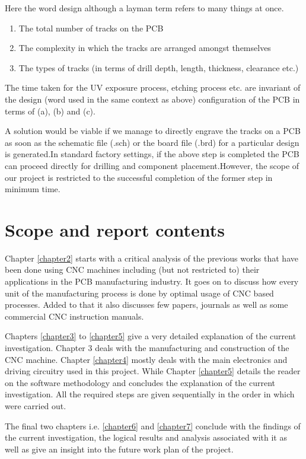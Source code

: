 Here the word design although a layman term refers to many things at once.
\begin{enumerate}
 \item The total number of tracks on the PCB
 \item The complexity in which the tracks are arranged amongst themselves
 \item The types of tracks (in terms of drill depth, length, thickness, clearance etc.)
\end{enumerate}

The time taken for the UV exposure process, etching process etc. are invariant of the design (word used in the same context as above) configuration of the PCB in terms of (a), (b) and (c). \par

A solution would be viable if we manage to directly engrave the tracks on a PCB as soon as the schematic file (.sch) or the board file (.brd) for a particular design is generated.In standard factory settings, if the above step is completed the PCB can proceed directly for drilling and component placement.However, the scope of our project is restricted to the successful completion of the former step in minimum time.



\section{Scope and report contents}
Chapter \ref{chapter2} starts with a critical analysis of the previous works that have been done using CNC machines including (but not restricted to) their applications in the PCB manufacturing industry. It goes on to discuss how every unit of the manufacturing process is done by optimal usage of CNC based processes. Added to that it also discusses few papers, journals as well as some commercial CNC instruction manuals. \par

Chapters \ref{chapter3} to \ref{chapter5} give a very detailed explanation of the current investigation. Chapter 3 deals with the manufacturing and construction of the CNC machine. Chapter \ref{chapter4} mostly deals with the main electronics and driving circuitry used in this project. While Chapter \ref{chapter5} details the reader on the software methodology and concludes the explanation of the current investigation. All the required steps are given sequentially in the order in which were carried out. \par

The final two chapters i.e. \ref{chapter6}  and \ref{chapter7} conclude with the findings of the current investigation, the logical results and analysis associated with it as well as give an insight into the future work plan of the project.
